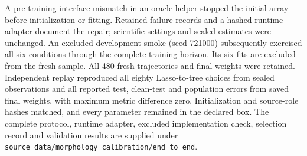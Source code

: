 A pre-training interface mismatch in an oracle helper stopped the initial
array before initialization or fitting. Retained failure records and a
hashed runtime adapter document the repair; scientific settings and sealed
estimates were unchanged. An excluded development smoke (seed 721000)
subsequently exercised all six conditions through the complete training
horizon. Its six fits are excluded from the fresh sample. All 480 fresh
trajectories and final weights were retained. Independent replay reproduced
all eighty Lasso-to-tree choices from sealed observations and all reported
test, clean-test and population errors from saved final weights, with
maximum metric difference zero. Initialization and source-role hashes
matched, and every parameter remained in the declared box. The complete protocol, runtime adapter, excluded implementation check,
selection record and validation results
are supplied under \texttt{source\_data/morphology\_calibration/end\_to\_end}.
